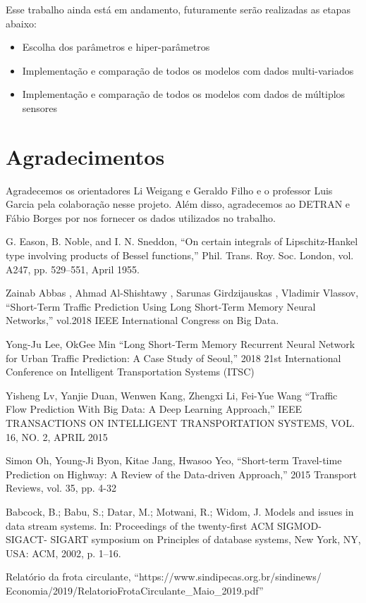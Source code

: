 \documentclass[conference]{IEEEtran}
\begin{document}
Esse trabalho ainda está em andamento, futuramente serão realizadas as etapas abaixo:

\begin{itemize}
    \item Escolha dos parâmetros e hiper-parâmetros
    \item Implementação e comparação de todos os modelos com dados multi-variados
    \item Implementação e comparação de todos os modelos com dados de múltiplos sensores
\end{itemize}

\section{Agradecimentos}

Agradecemos os orientadores Li Weigang e Geraldo Filho e o professor Luis Garcia pela colaboração nesse projeto. Além disso, agradecemos ao DETRAN e Fábio Borges por nos fornecer os dados utilizados no trabalho.

\begin{thebibliography}{00}
 G. Eason, B. Noble, and I. N. Sneddon, ``On certain integrals of Lipschitz-Hankel type involving products of Bessel functions,'' Phil. Trans. Roy. Soc. London, vol. A247, pp. 529--551, April 1955.

 Zainab Abbas , Ahmad Al-Shishtawy , Sarunas Girdzijauskas  , Vladimir Vlassov, ``Short-Term Traffic Prediction Using Long Short-Term Memory Neural Networks,'' vol.2018 IEEE International Congress on Big Data.

 Yong-Ju Lee, OkGee Min ``Long Short-Term Memory Recurrent Neural Network
for Urban Traffic Prediction: A Case Study of Seoul,'' 2018 21st International Conference on Intelligent Transportation Systems (ITSC)

 Yisheng Lv, Yanjie Duan, Wenwen Kang, Zhengxi Li, Fei-Yue Wang ``Traffic Flow Prediction With Big Data: A Deep
Learning Approach,'' IEEE TRANSACTIONS ON INTELLIGENT TRANSPORTATION SYSTEMS, VOL. 16, NO. 2, APRIL 2015

 Simon Oh, Young-Ji Byon, Kitae Jang, Hwasoo Yeo, ``Short-term Travel-time Prediction on Highway: A Review of the Data-driven Approach,'' 2015 Transport Reviews, vol. 35, pp. 4-32

 Babcock, B.; Babu, S.; Datar, M.; Motwani, R.; Widom, J. Models and issues in data stream systems. In: Proceedings of the twenty-first ACM SIGMOD-SIGACT- SIGART symposium on Principles of database systems, New York, NY, USA: ACM, 2002, p. 1–16.

 Relatório  da  frota  circulante, ``https://www.sindipecas.org.br/sindinews/
Economia/2019/RelatorioFrotaCirculante\_Maio\_2019.pdf''


\end{thebibliography}
\end{document}
